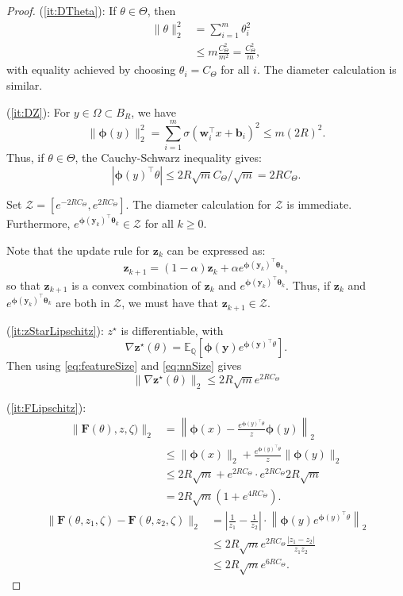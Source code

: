 \documentclass[twoside]{article}
\theoremstyle{definition}
\newcommand{\E}{\mathbb{E}}
\newcommand{\Q}{\mathbb{Q}}
\newcommand{\cZ}{\mathcal{Z}}
\newcommand{\1}[1]{\scalebox{1.25}{$\mathds{1}$}\left[#1\right]}
\begin{document}
\begin{proof}

(\ref{it:DTheta}): If $\theta\in\Theta$, then 
\begin{align*}
\|\theta\|_2^2&=\sum_{i=1}^m\theta_i^2 \\
&\le m\frac{C_{\Theta}^2}{m^2} = \frac{C_{\Theta}^2}{m},
\end{align*}
with equality achieved by choosing $\theta_i=C_{\Theta}$ for all $i$. The diameter calculation is similar. 

(\ref{it:DZ}): 
For $y\in \Omega\subset B_R$, we have
\begin{equation}
\label{eq:featureSize}
\|\bm{\phi}(y)\|_2^2 = \sum_{i=1}^m \sigma(\bm{w}_i^\top x + \bm{b}_i)^2 \le m (2R)^2.
\end{equation}
Thus, if $\theta\in\Theta$, the Cauchy-Schwarz inequality gives:
\begin{equation}
\label{eq:nnSize}
|\bm{\phi}(y)^\top \theta|\le 2R \sqrt{m} C_{\Theta}/\sqrt{m}= 2R C_{\Theta}.
\end{equation}

Set $\cZ=[e^{-2RC_{\Theta}},e^{2RC_{\Theta}}]$. The diameter calculation for $\cZ$ is immediate. Furthermore, $e^{\bm{\phi}(\bm{y}_{k})^\top \bm{\theta}_k}\in\cZ$ for all $k\ge 0.$

Note that the update rule for $\bm{z}_k$ can be expressed as:
$$
\bm{z}_{k+1}=(1-\alpha)\bm{z}_k+\alpha e^{\bm{\phi}(\bm{y}_k)^\top \bm{\theta}_k},
$$
so that $\bm{z}_{k+1}$ is a convex combination of $\bm{z}_k$ and $e^{\bm{\phi}(\bm{y}_k)^\top \bm{\theta}_k}$. Thus, if $\bm{z}_k$ and $e^{\bm{\phi}(\bm{y}_k)^\top \bm{\theta}_k}$ are both in $\cZ$, we must have that $\bm{z}_{k+1}\in \cZ$. 

(\ref{it:zStarLipschitz}): $z^\star$ is differentiable, with
$$
\nabla \bm{z}^\star(\theta)=\E_{\Q}\left[\bm{\phi}(\bm{y})e^{\bm{\phi}(\bm{y})^\top\theta}\right].
$$
Then using \eqref{eq:featureSize} and \eqref{eq:nnSize} gives 
$$
\|\nabla \bm{z}^\star(\theta)\|_{2}\le 2R\sqrt{m}e^{2R C_{\Theta}}
$$

(\ref{it:FLipschitz}):
\begin{align*}
\|\bm{F}(\theta),z,\zeta)\|_2 &=\left\|
\bm{\phi}(x)-\frac{e^{\bm{\phi}(y)^{\top}\theta}}{z}\bm{\phi}(y)
\right\|_2 \\
&\le \|\bm{\phi}(x)\|_2 + \frac{e^{\bm{\phi}(y)^{\top}\theta}}{z}\|\bm{\phi}(y)\|_2 \\
&\le 2R\sqrt{m}+e^{2RC_{\Theta}}\cdot e^{2RC_{\Theta}} 2R\sqrt{m}\\
&=2R\sqrt{m}\left(1+e^{4RC_{\Theta}}\right).
\end{align*}
\begin{align*}
\|\bm{F}(\theta,z_1,\zeta)-\bm{F}(\theta,z_2,\zeta)\|_2 &=
\left|
\frac{1}{z_1}-\frac{1}{z_2}
\right| \cdot \left\|\bm{\phi}(y)e^{\bm{\phi}(y)^\top \theta} \right\|_2 \\
&\le 2R \sqrt{m}e^{2RC_{\Theta}} \frac{|z_1-z_2|}{z_1 z_2} \\
&\le 2R \sqrt{m}e^{6RC_{\Theta}}.
\end{align*}


\end{proof}
\end{document}
